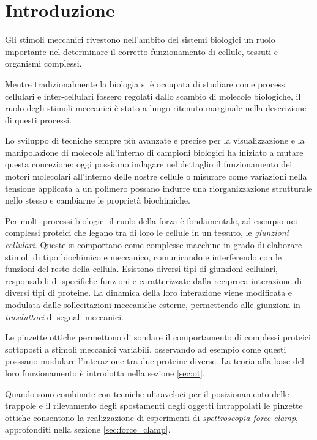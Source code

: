 
\chapter{Introduzione}


Gli stimoli meccanici rivestono nell'ambito dei sistemi biologici un
ruolo importante nel determinare il corretto funzionamento di cellule,
tessuti e organismi complessi.

Mentre tradizionalmente la biologia si è occupata di
studiare come processi cellulari e inter-cellulari fossero regolati
dallo scambio di molecole biologiche, il ruolo degli stimoli
meccanici è stato a lungo ritenuto marginale nella descrizione di
questi processi.

Lo sviluppo di tecniche sempre più avanzate e precise per la
visualizzazione e la manipolazione di molecole all'interno di campioni
biologici ha iniziato a mutare questa concezione: oggi possiamo
indagare nel dettaglio il funzionamento dei motori molecolari
all'interno delle nostre cellule o misurare come variazioni nella
tensione applicata a un polimero possano indurre una riorganizzazione
strutturale nello stesso e cambiarne le proprietà biochimiche.

Per molti processi biologici il ruolo della forza è fondamentale,
ad esempio nei complessi proteici che legano tra di loro le cellule
in un tessuto, le \emph{giunzioni cellulari}.
Queste si comportano come complesse macchine in grado di elaborare
stimoli di tipo biochimico e meccanico, comunicando e interferendo
con le funzioni del resto della cellula.
Esistono diversi tipi di giunzioni cellulari, responsabili di
specifiche funzioni e caratterizzate dalla reciproca interazione di
diversi tipi di proteine. La dinamica della loro interazione viene
modificata e modulata dalle sollecitazioni meccaniche esterne,
permettendo alle giunzioni in \emph{trasduttori} di segnali meccanici.

Le pinzette ottiche permettono di sondare il comportamento di
complessi proteici sottoposti a stimoli meccanici variabili,
osservando
ad esempio come questi posssano modulare l'interazione tra due
proteine diverse. La teoria alla base del loro funzionamento è
introdotta nella sezione \ref{sec:ot}.

Quando sono combinate con tecniche ultraveloci per il posizionamento
delle trappole e il rilevamento degli spostamenti degli oggetti
intrappolati le pinzette ottiche consentono la realizzazione di
esperimenti di \emph{spettroscopia force-clamp}, approfonditi nella
sezione \ref{sec:force_clamp}.

